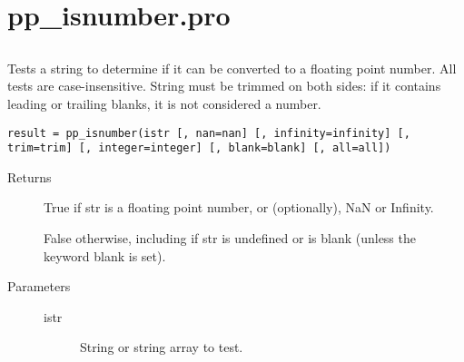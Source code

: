 \section{pp\_isnumber.pro}

























\subsection*{}

\marginnote{}


\noindent    Tests a string to determine if it can be converted to a floating point number.
    All tests are case-insensitive. String must be trimmed on both sides:
    if it contains leading or trailing blanks, it is not considered a number.
 
 
 
\vspace{1.1em}


\begin{syntaxheader}
\lstinline+result = pp_isnumber(istr [, nan=nan] [, infinity=infinity] [, trim=trim] [, integer=integer] [, blank=blank] [, all=all])+
\end{syntaxheader}


\begin{description}
\item[Returns]\hspace*{0em} \newline    True if str is a floating point number, or (optionally), NaN or Infinity.
 
    False otherwise, including if str is undefined or is blank (unless the
    keyword blank is set).
 
 
 
\end{description}



\begin{description}
\item[Parameters]\hspace*{0em} \newline
\begin{description}

\item[istr]\hspace*{1em} {\footnotesize {}  } \newline       String or string array to test.
 
 
 

\end{description}
\end{description}



